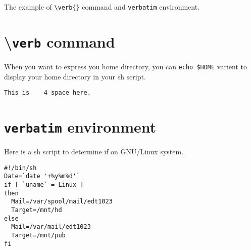 \documentclass{article}
\begin{document}
The example of \verb|\verb{}| command and \texttt{verbatim} environment.

\section{\textbackslash{}\texttt{verb} command}

When you want to express you home directory, you can \verb|echo $HOME|
varient to display your home directory in your sh script.

\noindent
\verb*|This is    4 space here.|

\section{\texttt{verbatim} environment}

Here is a sh script to determine if on GNU/Linux system.

\begin{verbatim}
#!/bin/sh
Date=`date '+%y%m%d'`
if [ `uname` = Linux ]
then
  Mail=/var/spool/mail/edt1023
  Target=/mnt/hd
else
  Mail=/var/mail/edt1023
  Target=/mnt/pub
fi
\end{verbatim}
\end{document}
